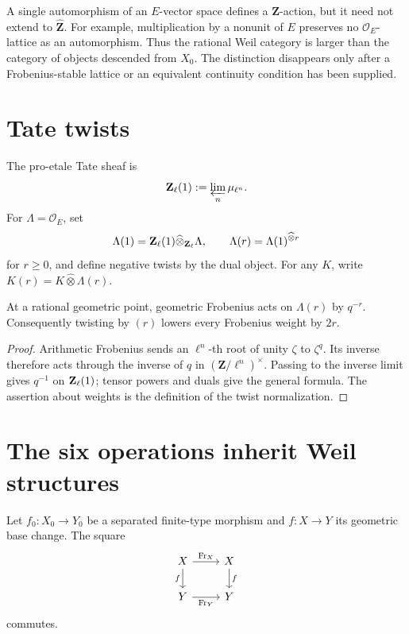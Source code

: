 \begin{warning}
A single automorphism of an \(E\)-vector space defines a
\(\mathbf Z\)-action, but it need not extend to
\(\widehat{\mathbf Z}\).  For example, multiplication by a nonunit of
\(E\) preserves no \(\mathcal O_E\)-lattice as an automorphism.  Thus the
rational Weil category is larger than the category of objects descended
from \(X_0\).  The distinction disappears only after a Frobenius-stable
lattice or an equivalent continuity condition has been supplied.
\end{warning}

\section{Tate twists}

\begin{definition}
\label{def:proetale-tate-object}
The pro-etale Tate sheaf is
\[
  \mathbf Z_\ell(1):=\varprojlim_n \mu_{\ell^n}.
\]
For \(\Lambda=\mathcal O_E\), set
\[
 \Lambda(1)=\mathbf Z_\ell(1)
   \widehat\otimes_{\mathbf Z_\ell}\Lambda,
 \qquad
 \Lambda(r)=\Lambda(1)^{\widehat\otimes r}
\]
for \(r\ge0\), and define negative twists by the dual object.
For any \(K\), write \(K(r)=K\widehat\otimes\Lambda(r)\).
\end{definition}

\begin{proposition}
\label{prop:tate-frobenius-normalization}
At a rational geometric point, geometric Frobenius acts on
\(\Lambda(r)\) by \(q^{-r}\).  Consequently twisting by \((r)\) lowers every
Frobenius weight by \(2r\).
\end{proposition}

\begin{proof}
Arithmetic Frobenius sends an \(\ell^n\)-th root of unity \(\zeta\) to
\(\zeta^q\).  Its inverse therefore acts through the inverse of \(q\) in
\((\mathbf Z/\ell^n)^{\times}\).  Passing to the inverse limit gives
\(q^{-1}\) on \(\mathbf Z_\ell(1)\); tensor powers and duals give the general formula.
The assertion about weights is the definition of the twist normalization.
\end{proof}

\section{The six operations inherit Weil structures}

Let \(f_0:X_0\to Y_0\) be a separated finite-type morphism and
\(f:X\to Y\) its geometric base change.  The square
\[
\begin{tikzcd}
X \arrow[r,"\Fr_X"] \arrow[d,"f"'] & X \arrow[d,"f"] \\
Y \arrow[r,"\Fr_Y"'] & Y
\end{tikzcd}
\]
commutes.

